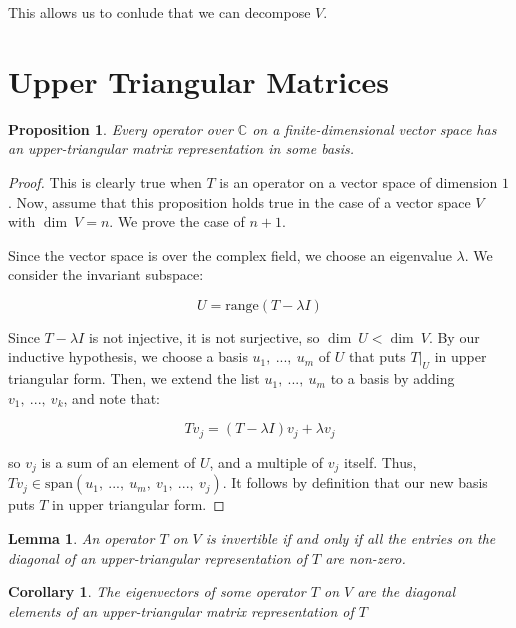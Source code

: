\documentclass[10pt, oneside]{article}
\newtheorem{lem}{Lemma}
\newtheorem{cor}{Corollary}
\newtheorem{prop}{Proposition}
\begin{document}
   This allows us to conlude that we can decompose $V$.

   \section{Upper Triangular Matrices}

   \begin{prop}
     Every operator over $\mathbb{C}$ on a finite-dimensional vector space has an upper-triangular matrix representation in some basis.
   \end{prop}

   \begin{proof}

     This is clearly true when $T$ is an operator on a vector space of dimension $1$. Now, assume that this proposition holds true
     in the case of a vector space $V$ with $\dim \ V = n$. We prove the case of $n + 1$.
     \newline

     Since the vector space is over the complex field, we choose an eigenvalue $\lambda$. We consider the invariant subspace:

     $$U = \text{range} (T - \lambda I)$$

     Since $T - \lambda I$ is not injective, it is not surjective, so $\dim \ U < \dim \ V$. By our inductive hypothesis, we choose a
     basis $u_1, \ ..., \ u_m$ of $U$ that puts $T|_{U}$ in upper triangular form. Then, we extend the list $u_1, \ ..., \ u_m$ to a basis
     by adding $v_1, \ ..., \ v_k$, and note that:

     $$Tv_j = (T - \lambda I)v_j + \lambda v_j$$

     so $v_j$ is a sum of an element of $U$, and a multiple of $v_j$ itself. Thus, $Tv_j \in \text{span}(u_1, \ ..., \ u_m, \ v_1, \ ..., \ v_j)$.
     It follows by definition that our new basis puts $T$ in upper triangular form.

     \end{proof}

   \begin{lem}
     An operator $T$ on $V$ is invertible if and only if all the entries on the diagonal of an
     upper-triangular representation of $T$ are non-zero.
     \end{lem}

   \begin{cor}
     The eigenvectors of some operator $T$ on $V$ are the diagonal elements of an
     upper-triangular matrix representation of $T$
     \end{cor}
\end{document}
